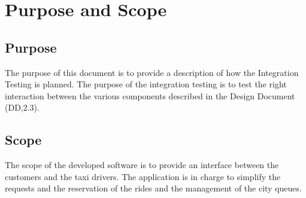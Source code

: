 \documentclass[../../../../testPlan.tex]{subfiles}
\begin{document}
	\section{Purpose and Scope}

		\subsection{Purpose}
			The purpose of this document is to provide a description of how the Integration Testing is planned. The purpose of the integration testing is to test the right interaction between the various components described in the Design Document (DD,2.3).

		\subsection{Scope}
			The scope of the developed software is to provide an interface between the customers and the taxi drivers. The application is in charge to simplify the requests and the reservation of the rides and the management of the city queues.
\end{document}
